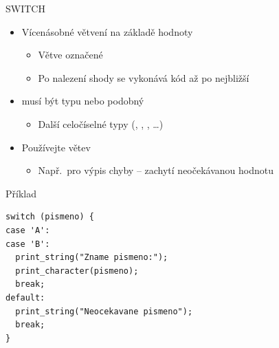 \begin{frame}[fragile]{SWITCH}

  \begin{itemize}
    \item Vícenásobné větvení na základě hodnoty 
    \begin{itemize}
      \item Větve označené 
      \item Po nalezení shody se vykonává kód až po nejbližší 
    \end{itemize}

    \pause

    \item {} musí být typu  nebo podobný
    \begin{itemize}
      \item Další celočíselné typy (, , ,
	\dots)
    \end{itemize}

    \pause

    \item Používejte  větev
    \begin{itemize}
      \item Např.\ pro výpis chyby -- zachytí neočekávanou hodnotu
    \end{itemize}

  \end{itemize}


\begin{block}{Příklad}
\begin{lstlisting}
switch (pismeno) {
case 'A':
case 'B':
  print_string("Zname pismeno:");
  print_character(pismeno);
  break;
default:
  print_string("Neocekavane pismeno");
  break;
}
\end{lstlisting}
\end{block}

\end{frame}


